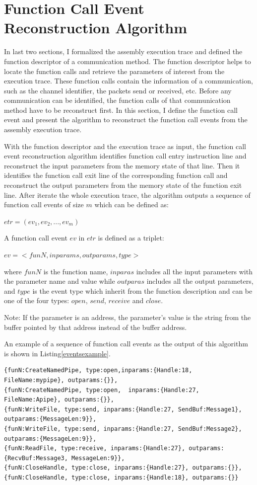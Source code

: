 \section{Function Call Event Reconstruction Algorithm}
In last two sections, I formalized the assembly execution trace and defined the function descriptor of a communication method. The function descriptor helps to locate the function calls and retrieve the parameters of interest from the execution trace. These function calls contain the information of a communication, such as the channel identifier, the packets send or received, etc. Before any communication can be identified, the function calls of that communication method have to be reconstruct first. In this section, I define the function call event and present the algorithm to reconstruct the function call events from the assembly execution trace. 

With the function descriptor and the execution trace as input, the function call event reconstruction algorithm identifies function call entry instruction line and reconstruct the input parameters from the memory state of that line. Then it identifies the function call exit line of the corresponding function call and reconstruct the output parameters from the memory state of the function exit line. After iterate the whole execution trace, the algorithm outputs a sequence of function call events of size $m$ which can be defined as:

$etr = (ev_1, ev_2, ..., ev_m)$

A function call event $ev$ in $etr$ is defined as a triplet:

$ev = <funN, inparams, outparams, type>$

where $funN$ is the function name, $inparas$ includes all the input parameters with the parameter name and value while $outparas$ includes all the output parameters, and $type$ is the event type which inherit from the function description and can be one of the four types: $open$, $send$, $receive$ and $close$.

Note: If the parameter is an address, the parameter's value is the string from the buffer pointed by that address instead of the buffer address.

An example of a sequence of function call events as the output of this algorithm is shown in Listing\ref{eventsexample}.

\begin{lstlisting}[caption= Example of  $etr$, label=eventsexample]
{funN:CreateNamedPipe, type:open,inparams:{Handle:18, FileName:mypipe}, outparams:{}},
{funN:CreateNamedPipe, type:open,  inparams:{Handle:27,  FileName:Apipe}, outparams:{}},
{funN:WriteFile, type:send, inparams:{Handle:27, SendBuf:Message1}, outparams:{MessageLen:9}},
{funN:WriteFile, type:send, inparams:{Handle:27, SendBuf:Message2}, outparams:{MessageLen:9}},
{funN:ReadFile, type:receive, inparams:{Handle:27}, outparams:{RecvBuf:Message3, MessageLen:9}},
{funN:CloseHandle, type:close, inparams:{Handle:27}, outparams:{}},
{funN:CloseHandle, type:close, inparams:{Handle:18}, outparams:{}}
\end{lstlisting}

